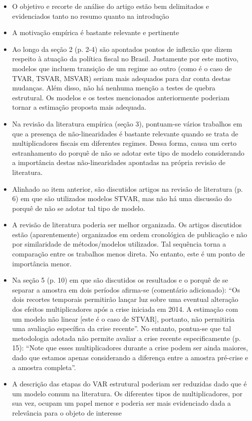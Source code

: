 \documentclass[11pt]{article}
\begin{document}
\begin{itemize}
\item O objetivo e recorte de análise do artigo estão bem delimitados e evidenciados tanto no resumo quanto na introdução
\item A motivação empírica é bastante relevante e pertinente
\item Ao longo da seção 2 (p. 2-4) são apontados pontos de inflexão que dizem respeito à atuação da política fiscal no Brasil.
Justamente por este motivo, modelos que incluem transição de um regime ao outro (como é o caso de TVAR, TSVAR, MSVAR) seriam mais adequados para dar conta destas mudanças.
Além disso, não há nenhuma menção a testes de quebra estrutural.
Os modelos e os testes mencionados anteriormente poderiam tornar a estimação proposta mais adequada.
\item Na revisão da literatura empírica (seção 3), pontuam-se vários trabalhos em que a presença de não-linearidades é bastante relevante quando se trata de multiplicadores fiscais em diferentes regimes.
Dessa forma, causa um certo estranhamento do porquê de não se adotar este tipo de modelo considerando a importância destas não-linearidades apontadas na própria revisão de literatura.
\item Alinhado ao item anterior, são discutidos artigos na revisão de literatura (p. 6) em que são utilizados modelos STVAR, mas não há uma discussão do porquê de não se adotar tal tipo de modelo.
\item A revisão de literatura poderia ser melhor organizada.
Os artigos discutidos estão (aparentemente) organizados em ordem cronológica de publicação e não por similaridade de métodos/modelos utilizados.
Tal sequência torna a comparação entre os trabalhos menos direta. No entanto, este é um ponto de importância menor.
\item Na seção 5 (p. 10) em que são discutidos os resultados e o porquê de se separar a amostra em dois períodos afirma-se (comentário adicionado): ``Os dois recortes temporais permitirão lançar luz sobre uma eventual alteração dos efeitos multiplicadores após a crise iniciada em 2014. A estimação com um modelo não linear [este é o caso de STVAR], portanto, não permitiria uma avaliação específica da crise recente''.
No entanto, pontua-se que tal metodologia adotada não permite avaliar a crise recente especificamente (p. 15): ``Note que esses multiplicadores durante  a crise podem ser ainda maiores, dado que estamos apenas considerando a diferença entre a amostra pré-crise e a amostra completa''.
\item A descrição das etapas do VAR estrutural poderiam ser reduzidas dado que é um modelo comum na literatura. Os diferentes tipos de multiplicadores, por sua vez, ocupam um papel menor e poderia ser mais evidenciado dada a relevância para o objeto de interesse

\end{itemize}
\end{document}
